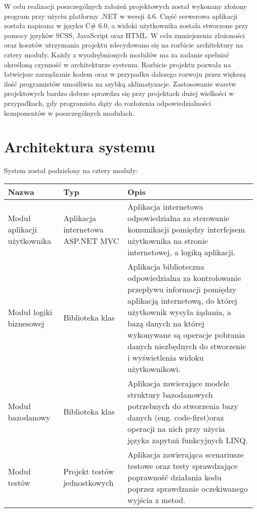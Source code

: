 

W celu realizacji poszczególnych założeń projektowych został wykonany złożony program przy użyciu platformy .NET w wersji 4.6. Część serwerowa aplikacji została napisana w języku C\# 6.0, a widoki użytkownika została stworzone przy pomocy języków SCSS, JavaScript oraz HTML. W celu zmniejszenia złożoności oraz kosztów utrzymania projektu zdecydowano się na rozbicie architektury na cztery moduły. Każdy z wyodrębnionych modułów ma za zadanie spełniać określoną czynność w architekturze systemu. Rozbicie projektu pozwala  na łatwiejsze zarządzanie kodem oraz w przypadku dalszego rozwoju przez większą ilość programistów umożliwia na szybką aklimatyzacje. Zastosowanie warstw projektowych bardzo dobrze sprawdza się przy projektach dużej wielkości w przypadkach, gdy programista dąży do rozłożenia odpowiedzialności komponentów w poszczególnych modułach.

\section{Architektura systemu}
System został podzielony na cztery moduły:
\begin{center}
    \begin{tabular}{ | p{3cm}| p{3cm} | p{7cm} |}
    \hline Nazwa & Typ &  Opis \\ \hline   
    \hline  Moduł aplikacji użytkownika &  Aplikacja \mbox{internetowa} ASP.NET MVC & Aplikacja internetowa odpowiedzialna za sterowanie komunikacji pomiędzy interfejsem użytkownika na stronie internetowej, a logiką aplikacji.\\ \hline
	\hline  Moduł logiki biznesowej & Biblioteka klas & Aplikacja biblioteczna odpowiedzialna za kontrolowanie przepływu informacji pomiędzy aplikacją internetową, do której użytkownik wysyła żądania, a bazą danych na której wykonywane są operacje pobrania danych niezbędnych do stworzenie i wyświetlenia widoku użytkownikowi.\\ \hline
	\hline Moduł  \mbox{bazodanowy} & Biblioteka klas & Aplikacja zawierające modele struktury bazodanowych potrzebnych do stworzenia bazy danych (eng. code-first)oraz operacji na nich przy użycia języka zapytań funkcyjnych LINQ.\\ \hline
		\hline Moduł testów & Projekt testów jednostkowych & Aplikacja zawierająca scenariusze testowe oraz testy sprawdzające poprawność działania kodu poprzez sprawdzanie oczekiwanego wyjścia z metod.\\ \hline
	\end{tabular}
\end{center}


